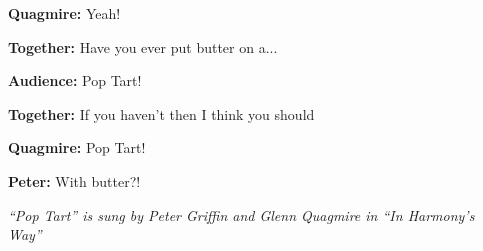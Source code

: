 \vspace{10pt}
\textbf{Quagmire:} Yeah!\par
\vspace{10pt}
\textbf{Together:} Have you ever put butter on a...\par
\vspace{10pt}
\textbf{Audience:} Pop Tart!\par
\vspace{10pt}
\textbf{Together:} If you haven't then I think you should\par
\vspace{10pt}
\textbf{Quagmire:} Pop Tart!\par
\vspace{10pt}
\textbf{Peter:} With butter?!\par
\vspace{10pt}
{\footnotesize\textit{``Pop Tart'' is sung by Peter Griffin and Glenn Quagmire in ``In Harmony's Way''}}
